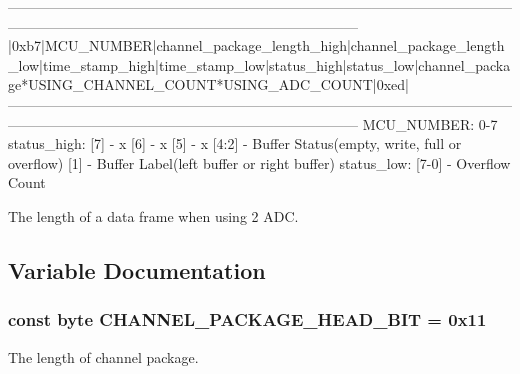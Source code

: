 \begin{DoxyVerb}---------------------------------------------------------------------------------------------------------------------------------------------------------------------------------------
|0xb7|MCU_NUMBER|channel_package_length_high|channel_package_length_low|time_stamp_high|time_stamp_low|status_high|status_low|channel_package*USING_CHANNEL_COUNT*USING_ADC_COUNT|0xed|
---------------------------------------------------------------------------------------------------------------------------------------------------------------------------------------
MCU_NUMBER: 0-7
status_high: [7] - x
             [6] - x
             [5] - x
             [4:2] - Buffer Status(empty, write, full or overflow)
             [1] - Buffer Label(left buffer or right buffer)
status_low: [7-0] - Overflow Count
\end{DoxyVerb}
The length of a data frame when using 2 A\-D\-C. 

\subsection{Variable Documentation}
\hypertarget{group___a_r_m_const_ga09ff0a5f36e6ede5798a5c19677d5518}{
\subsubsection[{C\-H\-A\-N\-N\-E\-L\-\_\-\-P\-A\-C\-K\-A\-G\-E\-\_\-\-H\-E\-A\-D\-\_\-\-B\-I\-T}]{\setlength{\rightskip}{0pt plus 5cm}const byte C\-H\-A\-N\-N\-E\-L\-\_\-\-P\-A\-C\-K\-A\-G\-E\-\_\-\-H\-E\-A\-D\-\_\-\-B\-I\-T = 0x11}}\label{group___a_r_m_const_ga09ff0a5f36e6ede5798a5c19677d5518}
The length of channel package.

